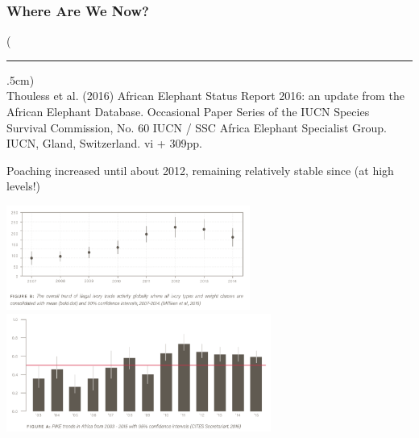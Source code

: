 \documentclass[10pt]{beamer}
\newenvironment{reference}[2]{%
	\begin{textblock*}{\textwidth}(#1,#2)
		\tiny\bgroup\color{gray}}{\egroup\end{textblock*}}
\begin{document}
\begin{frame}[t]
\frametitle{Where Are We Now?}
\vspace{0.25cm}

	\begin{reference}{4mm}{88mm}
		\rule{1.5cm}{0.25pt}\\
		Thouless et al. (2016) African Elephant Status Report 2016: an update from the African Elephant Database. Occasional Paper Series of the IUCN Species Survival Commission, No. 60 IUCN / SSC Africa Elephant Specialist Group. IUCN, Gland, Switzerland. vi + 309pp.
	\end{reference}
	
	
	Poaching increased until about 2012, remaining relatively stable since (at high levels!)\\
	
	\vspace{0.25cm}
	
	\begin{center}
		\includegraphics[width=0.60\textwidth]{figures/current_poaching.png}\\
		\vspace{0.25cm}
		\includegraphics[width=0.650\textwidth]{figures/current_poaching2.png}
	\end{center}	
\end{frame}
\end{document}
